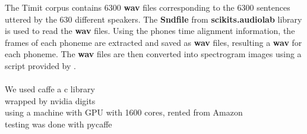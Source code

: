 The Timit corpus contains 6300 \textbf{wav} files corresponding to the 6300 sentences uttered by the 630 different speakers. The \textbf{Sndfile} from \textbf{scikits.audiolab} library is used to read the \textbf{wav} files. Using the phones time alignment information, the frames of each phoneme are extracted and saved as \textbf{wav} files, resulting a \textbf{wav} for each phoneme. The \textbf{wav} files are then converted into spectrogram images using a script provided by \cite{pannous}.\\\\

We used caffe a c library\\
wrapped by nvidia digits\\
using a machine with GPU with 1600 cores, rented from Amazon\\
testing was done with pycaffe